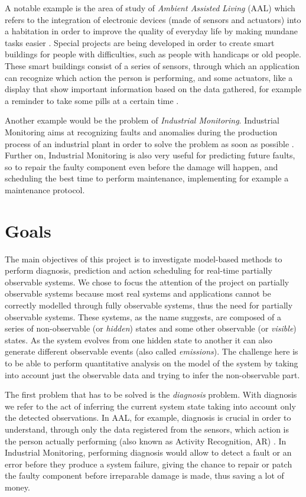 \documentclass{article}
\begin{document}
        A notable example is the area of study of \textit{Ambient Assisted Living} (AAL) which refers to the integration of electronic devices (made of sensors and actuators) into a habitation in order to improve the quality of everyday life by making mundane tasks easier \cite{cook2009ambient}. Special projects are being developed in order to create smart buildings for people with difficulties, such as people with handicaps or old people. These smart buildings consist of a series of sensors, through which an application can recognize which action the person is performing, and some actuators, like a display that show important information based on the data gathered, for example a reminder to take some pills at a certain time \cite{qest15, epew16}.
        
        Another example would be the problem of \textit{Industrial Monitoring}. Industrial Monitoring aims at recognizing faults and anomalies during the production process of an industrial plant in order to solve the problem as soon as possible \cite{chiang2001fault}. Further on, Industrial Monitoring is also very useful for predicting future faults, so to repair the faulty component even before the damage will happen, and scheduling the best time to perform maintenance, implementing for example a maintenance protocol.
        
    \section*{Goals}
    
        The main objectives of this project is to investigate model-based methods to perform diagnosis, prediction and action scheduling for real-time partially observable systems. We chose to focus the attention of the project on partially observable systems because most real systems and applications cannot be correctly modelled through fully observable systems, thus the need for partially observable systems. These systems, as the name suggests, are composed of a series of non-observable (or \textit{hidden}) states and some other observable (or \textit{visible}) states. As the system evolves from one hidden state to another it can also generate different observable events (also called \textit{emissions}). The challenge here is to be able to perform quantitative analysis on the model of the system by taking into account just the observable data and trying to infer the non-observable part.
        
        The first problem that has to be solved is the \textit{diagnosis} problem. With diagnosis we refer to the act of inferring the current system state taking into account only the detected observations. In AAL, for example, diagnosis is crucial in order to understand, through only the data registered from the sensors, which action is the person actually performing (also known as Activity Recognition, AR) \cite{qest15}. In Industrial Monitoring, performing diagnosis would allow to detect a fault or an error before they produce a system failure, giving the chance to repair or patch the faulty component before irreparable damage is made, thus saving a lot of money.
        
\end{document}
